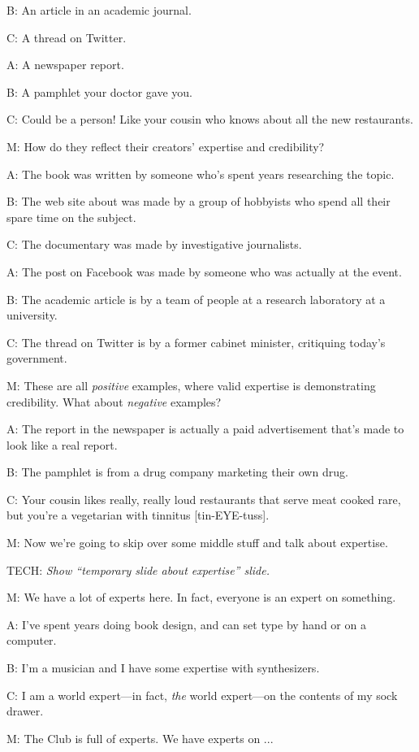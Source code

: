 \documentclass[17pt]{extarticle}
\begin{document}
B:  An article in an academic journal.

C:  A thread on Twitter.

A:  A newspaper report.

B:  A pamphlet your doctor gave you.

C:  Could be a person!  Like your cousin who knows about all the new restaurants.

M:  How do they reflect their creators' expertise and credibility?

A:  The book was written by someone who's spent years researching the topic.

B:  The web site about was made by a group of hobbyists who spend all their spare time on the subject.

C:  The documentary was made by investigative journalists.

A:  The post on Facebook was made by someone who was actually at the event.

B:  The academic article is by a team of people at a research laboratory at a university.

C:  The thread on Twitter is by a former cabinet minister, critiquing today's government.

M:  These are all \textit{positive} examples, where valid expertise is demonstrating credibility.  What about \textit{negative} examples?

A:  The report in the newspaper is actually a paid advertisement that's made to look like a real report.

B:  The pamphlet is from a drug company marketing their own drug.

C:  Your cousin likes really, really loud restaurants that serve meat cooked rare, but you're a vegetarian with tinnitus [tin-EYE-tuss].

M:  Now we're going to skip over some middle stuff and talk about expertise.

TECH:  \textit{Show ``temporary slide about expertise'' slide.}

M:  We have a lot of experts here.  In fact, everyone is an expert on something.

A:  I've spent years doing book design, and can set type by hand or on a computer.

B:  I'm a musician and I have some expertise with synthesizers.

C:  I am a world expert---in fact, \textit{the} world expert---on the contents of my sock drawer.

M:  The Club is full of experts.  We have experts on ...
\end{document}
